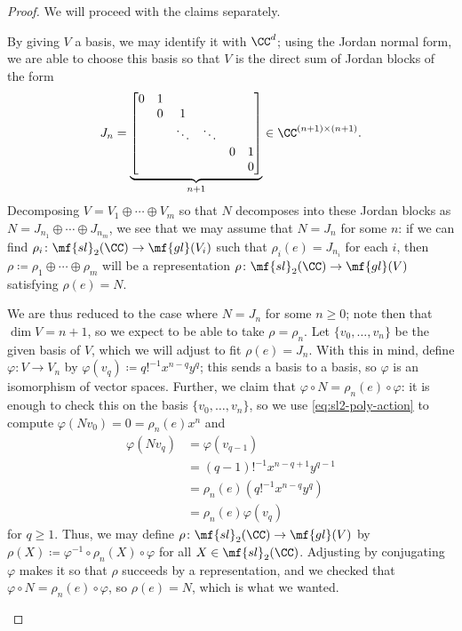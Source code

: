 \documentclass[../notes.tex]{subfiles}
\begin{document}
\begin{proof}
	We will proceed with the claims separately.
	\begin{listalph}
		\item By giving $V$ a basis, we may identify it with $\CC^d$; using the Jordan normal form, we are able to choose this basis so that $V$ is the direct sum of Jordan blocks of the form
		\[J_n=\underbrace{\begin{bmatrix}
			0 & 1 \\
			  & 0 & 1 \\
			  &   & \ddots & \ddots \\
			  &   &        &        & 0 & 1 \\
			  &   &        &        &   & 0
		\end{bmatrix}}_{n+1}\in \CC^{(n+1)\times(n+1)}.\]
		Decomposing $V=V_1\oplus\cdots\oplus V_m$ so that $N$ decomposes into these Jordan blocks as $N=J_{n_1}\oplus\cdots\oplus J_{n_m}$, we see that we may assume that $N=J_n$ for some $n$: if we can find $\rho_i\colon\mf{sl}_2(\CC)\to\mf{gl}(V_i)$ such that $\rho_i(e)=J_{n_i}$ for each $i$, then $\rho\coloneqq\rho_1\oplus\cdots\oplus\rho_m$ will be a representation $\rho\colon\mf{sl}_2(\CC)\to\mf{gl}(V)$ satisfying $\rho(e)=N$.

		We are thus reduced to the case where $N=J_n$ for some $n\ge0$; note then that $\dim V=n+1$, so we expect to be able to take $\rho=\rho_n$. Let $\{v_0,\ldots,v_n\}$ be the given basis of $V$, which we will adjust to fit $\rho(e)=J_n$. With this in mind, define $\varphi\colon V\to V_n$ by $\varphi(v_q)\coloneqq q!^{-1}x^{n-q}y^q$; this sends a basis to a basis, so $\varphi$ is an isomorphism of vector spaces. Further, we claim that $\varphi\circ N=\rho_n(e)\circ\varphi$: it is enough to check this on the basis $\{v_0,\ldots,v_n\}$, so we use \eqref{eq:sl2-poly-action} to compute $\varphi(Nv_0)=0=\rho_n(e)x^n$ and
		\begin{align*}
			\varphi(Nv_q) &= \varphi(v_{q-1}) \\
			&= (q-1)!^{-1}x^{n-q+1}y^{q-1} \\
			&= \rho_n(e)\left(q!^{-1}x^{n-q}y^q\right) \\
			&= \rho_n(e)\varphi(v_q)
		\end{align*}
		for $q\ge1$. Thus, we may define $\rho\colon\mf{sl}_2(\CC)\to\mf{gl}(V)$ by $\rho(X)\coloneqq\varphi^{-1}\circ\rho_n(X)\circ\varphi$ for all $X\in\mf{sl}_2(\CC)$. Adjusting by conjugating $\varphi$ makes it so that $\rho$ succeeds by a representation, and we checked that $\varphi\circ N=\rho_n(e)\circ\varphi$, so $\rho(e)=N$, which is what we wanted.


\end{listalph}
\end{proof}
\end{document}
